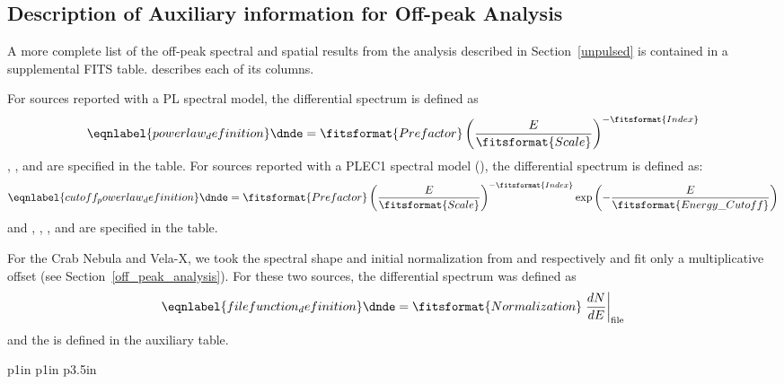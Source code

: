 \subsection{Description of Auxiliary information for Off-peak Analysis}
\label{off_peak_auxiliary}

A more complete list of the off-peak spectral and spatial 
results from the analysis described in Section~\ref{unpulsed}
is contained
in a supplemental FITS table.
 describes each of its columns.

For sources reported with a PL spectral model,
the differential spectrum is defined as
\begin{equation}\eqnlabel{powerlaw_definition}
  \dnde = \fitsformat{Prefactor} \left(\frac{E}{\fitsformat{Scale}}\right)^{-\fitsformat{Index}}
\end{equation}
, , and  are specified in the table.
For sources reported with a PLEC1 spectral model (\fitsformat{\PLSuperExpCutoff}), the differential spectrum is defined as:
\begin{equation}\eqnlabel{cutoff_powerlaw_definition}
  \dnde = \fitsformat{Prefactor} \left(\frac{E}{\fitsformat{Scale}}\right)^{-\fitsformat{Index}} \exp\left(-\frac{E}{\fitsformat{Energy\_Cutoff}}\right)
\end{equation}
and , , , and  are specified in the table.

For the Crab Nebula and Vela-X, we took the spectral shape and
initial normalization from \citet{LAT_collaboration_crab_2012} and
\cite{FermiVelaX2nd} respectively
and fit only a
multiplicative offset (see Section~\ref{off_peak_analysis}). For these two
sources, the differential spectrum was defined as
\begin{equation}\eqnlabel{filefunction_definition}
  \dnde = \fitsformat{Normalization} \left.\frac{dN}{dE}\right|_\mathrm{file}
\end{equation}
and the  is defined in the auxiliary table.

\begin{deluxetable}{p{1in} p{1in} p{3.5in}}
\tablewidth{0pt}
\tabletypesize{\scriptsize}
\tablewidth{6in}

\end{deluxetable}
\clearpage
